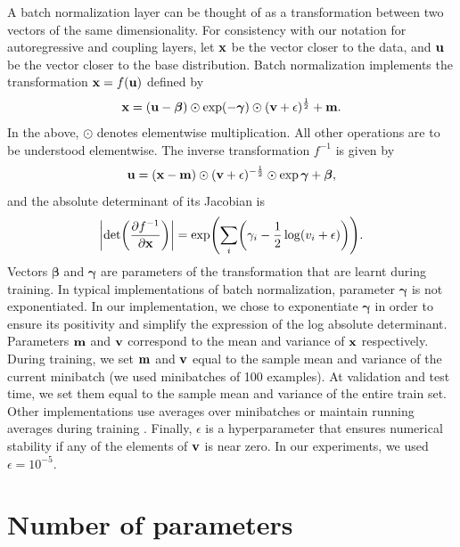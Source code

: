 A batch normalization layer can be thought of as a transformation between two vectors of the same dimensionality. For consistency with our notation for autoregressive and coupling layers, let $\mathbf{x}$ be the vector closer to the data, and $\mathbf{u}$ be the vector closer to the base distribution. Batch normalization implements the transformation $\mathbf{x} = f\mathopen{}\left(\mathbf{u}\right)\mathclose{}$ defined by
\begin{equation}
\mathbf{x} = \mathopen{}\left(\mathbf{u} - \bm{\beta}\right)\mathclose{}\odot\exp\mathopen{}\left(-\bm{\gamma}\right)\mathclose{}\odot\mathopen{}\left(\mathbf{v}+\epsilon\right)\mathclose{}^{\frac{1}{2}} + \mathbf{m}.
\end{equation}
In the above, $\odot$ denotes elementwise multiplication. All other operations are  to be understood elementwise. The inverse transformation $f^{-1}$ is given by
\begin{equation}
\mathbf{u} = \mathopen{}\left(\mathbf{x} - \mathbf{m}\right)\mathclose{}\odot\mathopen{}\left(\mathbf{v} + \epsilon\right)\mathclose{}^{-\frac{1}{2}}\odot\exp{\bm{\gamma}} + \bm{\beta},
\end{equation}
and the absolute determinant of its Jacobian is
\begin{equation}
\left|\det\mathopen{}\left(\frac{\partial{f^{-1}}}{\partial{\mathbf{x}}}\right)\mathclose{}\right| = \exp\mathopen{}\left(\sum_i\mathopen{}\left(\gamma_i - \frac{1}{2}\log\mathopen{}\left(v_{i} + \epsilon\right)\mathclose{}\right)\mathclose{}\right)\mathclose{}.
\end{equation}
Vectors $\bm{\beta}$ and $\bm{\gamma}$ are parameters of the transformation that are learnt during training. In typical implementations of batch normalization, parameter $\bm{\gamma}$ is not exponentiated. In our implementation, we chose to exponentiate $\bm{\gamma}$ in order to ensure its positivity and simplify the expression of the log absolute determinant. Parameters $\mathbf{m}$ and $\mathbf{v}$ correspond to the mean and variance of $\mathbf{x}$ respectively. During training, we set $\mathbf{m}$ and $\mathbf{v}$ equal to the sample mean and variance of the current minibatch (we used minibatches of 100 examples). At validation and test time, we set them equal to the sample mean and variance of the entire train set. Other implementations use averages over minibatches \citep{Ioffe:2015} or maintain running averages during training \citep{Dinh:2017}. Finally, $\epsilon$ is a hyperparameter that ensures numerical stability if any of the elements of $\mathbf{v}$ is near zero. In our experiments, we used $\epsilon = 10^{-5}$.


\section{Number of parameters}
\label{sec:parameters}


